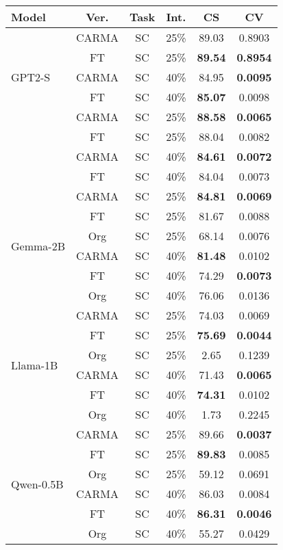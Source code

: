 \begin{table}[h]
\centering
\small
\begin{tabular}{|l|c|c|c|c|c|}
\hline
\textbf{Model} & \textbf{Ver.} & \textbf{Task} & \textbf{Int.} & \textbf{CS} & \textbf{CV} \\
\hline
\multirow{5}{*}{GPT2-S} 
& CARMA & SC & 25\% & 89.03 & 0.8903 \\
& FT & SC & 25\% & \textbf{89.54} & \textbf{0.8954} \\
\cline{2-6}
& CARMA & SC & 40\% &84.95 & \textbf{0.0095} \\
& FT & SC & 40\% & \textbf{85.07} & 0.0098 \\
\hline


\multirow{5}{*}{GPT2-L} 
& CARMA & SC & 25\% & \textbf{88.58} & \textbf{0.0065} \\
& FT & SC & 25\% & 88.04 & 0.0082 \\
\cline{2-6}
& CARMA & SC & 40\% & \textbf{84.61} & \textbf{0.0072} \\
& FT & SC & 40\% & 84.04 &0.0073  \\
\hline


\multirow{6}{*}{Gemma-2B} 

& CARMA & SC & 25\% & \textbf{84.81} & \textbf{0.0069} \\
& FT & SC & 25\% & 81.67 & 0.0088 \\
& Org & SC & 25\% & 68.14 & 0.0076 \\
\cline{2-6}
& CARMA & SC & 40\% & \textbf{81.48}  & 0.0102 \\
& FT & SC & 40\% & 74.29 & \textbf{0.0073} \\
& Org & SC & 40\% & 76.06 & 0.0136 \\
\hline

\multirow{6}{*}{Llama-1B} 
& CARMA & SC & 25\% & 74.03 & 0.0069 \\
& FT & SC & 25\% & \textbf{75.69} & \textbf{0.0044} \\
& Org & SC & 25\% & 2.65 & 0.1239 \\
\cline{2-6}
& CARMA & SC & 40\% & 71.43 & \textbf{0.0065} \\
& FT & SC & 40\% & \textbf{74.31} & 0.0102 \\
& Org & SC & 40\% & 1.73 & 0.2245 \\
\hline

\multirow{6}{*}{Qwen-0.5B} 
& CARMA & SC & 25\% & 89.66 & \textbf{0.0037} \\
& FT & SC & 25\% & \textbf{89.83} & 0.0085 \\
& Org & SC & 25\% & 59.12 & 0.0691 \\
\cline{2-6}
& CARMA & SC & 40\% & 86.03 & 0.0084 \\
& FT & SC & 40\% & \textbf{86.31} & \textbf{0.0046} \\
& Org & SC & 40\% & 55.27 & 0.0429 \\
\hline




\end{tabular}
\end{table}
